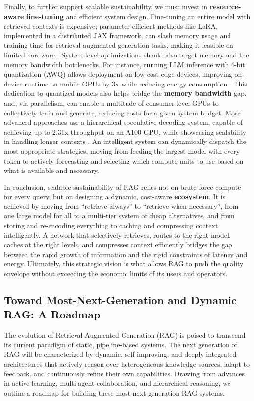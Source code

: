 \documentclass[11pt]{article}
\begin{document}
Finally, to further support scalable sustainability, we must invest in \textbf{resource-aware fine-tuning} and efficient system design. Fine-tuning an entire model with retrieved contexts is expensive; parameter-efficient methods like LoRA, implemented in a distributed JAX framework, can slash memory usage and training time for retrieval-augmented generation tasks, making it feasible on limited hardware \cite{ref463}. System-level optimizations should also target memory and the memory bandwidth bottlenecks. For instance, running LLM inference with 4-bit quantization (AWQ) allows deployment on low-cost edge devices, improving on-device runtime on mobile GPUs by 3x while reducing energy consumption \cite{ref464}. This dedication to quantized models also helps bridge the \textbf{memory bandwidth} gap, and, via parallelism, can enable a multitude of consumer-level GPUs to collectively train and generate, reducing costs for a given system budget. More advanced approaches use a hierarchical speculative decoding system, capable of achieving up to 2.31x throughput on an A100 GPU, while showcasing scalability in handling longer contexts \cite{ref328}. An intelligent system can dynamically dispatch the most appropriate strategies, moving from feeding the largest model with every token to actively forecasting and selecting which compute units to use based on what is available and necessary.

In conclusion, scalable sustainability of RAG relies not on brute-force compute for every query, but on designing a dynamic, cost-aware \textbf{ecosystem}. It is achieved by moving from ``retrieve always'' to ``retrieve when necessary'', from one large model for all to a multi-tier system of cheap alternatives, and from storing and re-encoding everything to caching and compressing context intelligently. A network that selectively retrieves, routes to the right model, caches at the right levels, and compresses context efficiently bridges the gap between the rapid growth of information and the rigid constraints of latency and energy. Ultimately, this strategic vision is what allows RAG to push the quality envelope without exceeding the economic limits of its users and operators.

\subsection{Toward Most-Next-Generation and Dynamic RAG: A Roadmap}

The evolution of Retrieval-Augmented Generation (RAG) is poised to transcend its current paradigm of static, pipeline-based systems. The next generation of RAG will be characterized by dynamic, self-improving, and deeply integrated architectures that actively reason over heterogeneous knowledge sources, adapt to feedback, and continuously refine their own capabilities. Drawing from advances in active learning, multi-agent collaboration, and hierarchical reasoning, we outline a roadmap for building these most-next-generation RAG systems.
\end{document}
